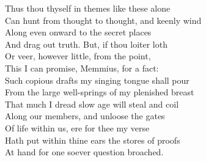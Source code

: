 Thus thou thyself in themes like these alone\\
Can hunt from thought to thought, and keenly wind\\
Along even onward to the secret places\\
And drag out truth. But, if thou loiter loth\\
Or veer, however little, from the point,\\
This I can promise, Memmius, for a fact:\\
Such copious drafts my singing tongue shall pour\\
From the large well-springs of my plenished breast\\
That much I dread slow age will steal and coil\\
Along our members, and unloose the gates\\
Of life within us, ere for thee my verse\\
Hath put within thine ears the stores of proofs\\
At hand for one soever question broached.


